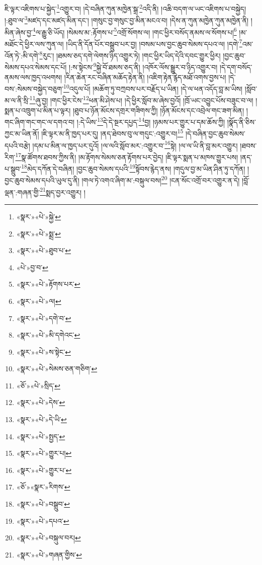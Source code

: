 ཇི་ལྟར་འཇིགས་པ་སྐྱེད་\footnote{«སྣར་»«པེ་»སྐྱེ་}འགྱུར་བ། །དེ་བཞིན་ཀུན་མཁྱེན་སྒྲ་\footnote{«སྣར་»«པེ་»སྨྲ་}འདི་ནི། །འཆི་བདག་ལ་ཡང་འཇིགས་པ་བསྐྱེད། །:ཐུབ་ལ་\footnote{«སྣར་»«པེ་»ཐུབ་པ་}མཛད་དང་མཛད་མིན་དང་། །གསུང་བྱ་གསུང་བྱ་མིན་མངའ་བ། །དེས་ན་ཀུན་མཁྱེན་ཀུན་མཁྱེན་ནི། །མིན་ཞེས་བྱ་\footnote{«པེ་»བྱ་བ་}ལ་རྒྱུ་ཅི་ཡོད། །སེམས་མ་:རྟོགས་པ་\footnote{«སྣར་»«པེ་»རྟོགས་པར་}འགྲོ་སོགས་ལ། །གང་ཕྱིར་བསོད་ནམས་ལ་སོགས་པ།\footnote{«སྣར་»«པེ་»ལ།} །མ་མཐོང་དེ་ཕྱིར་ལས་ཀུན་ལ། །ཡིད་ནི་དོན་པོར་བསྒྲུབ་པར་བྱ། །བསམ་པས་བྱང་ཆུབ་སེམས་དཔའ་ལ། །དགེ་\footnote{«སྣར་»«པེ་»དགེ་བ་}འམ་འོན་ཏེ་:མི་དགེ་\footnote{«སྣར་»«པེ་»མི་དགེའང་}རུང་། །ཐམས་ཅད་དགེ་ལེགས་ཉིད་འགྱུར་ཏེ། །གང་ཕྱིར་ཡིད་དེའི་དབང་གྱུར་ཕྱིར། །བྱང་ཆུབ་སེམས་དཔའ་སེམས་དང་པོ། །:ས་སྟེངས་\footnote{«སྣར་»«པེ་»ས་སྟེང་}སྐྱེ་བོ་ཐམས་ཅད་ནི། །འཁོར་ལོས་སྒྱུར་བ་ཉིད་འགྱུར་བ། །དེ་དག་བསོད་ནམས་ལས་ཁྱད་འཕགས། །རིན་ཆེན་རང་བཞིན་མཆོད་རྟེན་ནི། །འཇིག་རྟེན་རྙེད་མཐོ་འགས་བྱས་པ། །དེ་བས་:སེམས་བསྐྱེད་བཅུག་\footnote{«སྣར་»«པེ་»སེམས་ཅན་གཅིག་}འདུལ་པོ། །མཆོག་ཏུ་བཀྲབས་པར་བརྗོད་པ་ཡིན། །དེ་ལ་ཕན་འདོད་བླ་མ་ཡིས། །སློབ་མ་ལ་ནི་སྲི་\footnote{«ཅོ་»«པེ་»སྲིད་}ཞུ་བྱ། །གང་ཕྱིར་ངེས་\footnote{«སྣར་»«པེ་»དེས་}ཕན་མི་ཤེས་པ། །དེ་ཕྱིར་སློབ་མ་ཞེས་བྱའོ། །ཁྲོ་ཡང་འབྱུང་པོས་བཟུང་བ་ལ། །སྨན་པ་འཁྲུག་པ་མིན་པ་ལྟར། །ཐུབ་པ་ཉོན་མོངས་དགྲར་གཟིགས་ཀྱི། །ཉོན་མོངས་དང་འབྲེལ་གང་ཟག་མིན། །གང་ཞིག་གང་གང་ལ་དགའ་བ། །:དེ་ཡིས་\footnote{«སྣར་»«པེ་»དེ་ཡི་}དེ་དེ་སྔར་དཔྱད་\footnote{«སྣར་»«པེ་»སྤྱད་}བྱ། །ཉམས་པར་གྱུར་པ་དམ་ཆོས་ཀྱི། །སྣོད་ནི་ཅིས་ཀྱང་མ་ཡིན་ནོ། །ཇི་ལྟར་མ་ནི་ཁྱད་པར་དུ། །ནད་ཐེབས་བུ་ལ་གདུང་:འགྱུར་བ།\footnote{«སྣར་»«པེ་»གྱུར་པ།} །དེ་བཞིན་བྱང་ཆུབ་སེམས་དཔའི་བརྩེ། །དམ་པ་མིན་ལ་ཁྱད་པར་དུའོ། །ལ་ལའི་སློབ་མར་:འགྱུར་བ་\footnote{«སྣར་»«པེ་»གྱུར་པ་}སྟེ། །ལ་ལ་ཡི་ནི་བླ་མར་འགྱུར། །ཐབས་རིག་\footnote{«ཅོ་»«སྣར་»རིགས་}སྣ་ཚོགས་ཐབས་ཀྱིས་ནི། །མ་རྟོགས་སེམས་ཅན་རྟོགས་པར་བྱེད། །ཇི་ལྟར་སྨན་པ་མཁས་གྱུར་པས། །ནད་པ་སྒྲུབ་\footnote{«སྣར་»«པེ་»བསྒྲུབ་}མེད་དཀོན་དེ་བཞིན། །བྱང་ཆུབ་སེམས་དཔའི་\footnote{«སྣར་»«པེ་»དཔའ་}སྟོབས་རྙེད་ནས། །གདུལ་བྱ་མ་ཡིན་ཤིན་ཏུ་དཀོན། །བྱང་ཆུབ་སེམས་དཔའི་ཡུལ་དུ་ནི། །གལ་ཏེ་འགའ་ཞིག་མ་:བསྐུལ་བས།\footnote{«སྣར་»«པེ་»བསྐུལ་བར།} །ངན་སོང་འགྲོ་བར་འགྱུར་ན་དེ། །བློ་ལྡན་:གཞན་གྱི་\footnote{«སྣར་»«པེ་»གཞན་གྱིས་}སྨད་བྱར་འགྱུར། །

